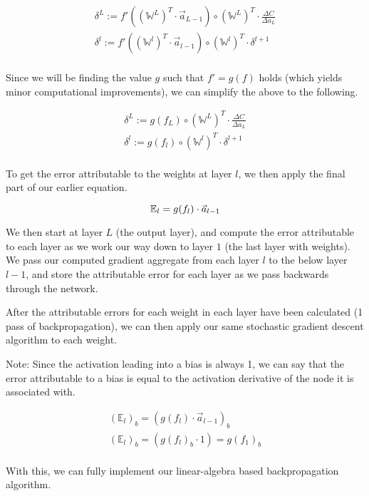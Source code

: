 \documentclass[8pt]{amsart}
\newcommand\mat[1]{\mathbb{#1}}
\begin{document}
\[
    \begin{aligned}
        \delta^L := f'( (\mat{W}^L)^T \cdot \vec{a}_{L - 1} ) \circ (\mat{W}^L)^T \cdot \frac{ \Delta C }{ \Delta a_L } \\
        \delta^l := f'( (\mat{W}^{l})^T \cdot \vec{a}_{l - 1} ) \circ (\mat{W}^{l})^T \cdot \delta^{l + 1} \\
    \end{aligned}
\]

Since we will be finding the value $g$ such that $f' = g(f)$ holds (which yields minor
computational improvements), we can simplify the above to the following.

\[
    \begin{aligned}
        \delta^L := g(f_L) \circ (\mat{W}^L)^T \cdot \frac{ \Delta C }{ \Delta a_L } \\
        \delta^l := g(f_l) \circ (\mat{W}^{l})^T \cdot \delta^{l + 1} \\
    \end{aligned}
\]

To get the error attributable to the weights at layer $l$, we then apply the final part
of our earlier equation.

\[
    \mat{E}_l = g(f_l) \cdot \vec{a}_{l - 1} \\
\]

We then start at layer $L$ (the output layer), and compute the error attributable to
each layer as we work our way down to layer $1$ (the last layer with weights). We pass
our computed gradient aggregate from each layer $l$ to the below layer $l - 1$, and store
the attributable error for each layer as we pass backwards through the network.

After the attributable errors for each weight in each layer have been calculated (1 pass
of backpropagation), we can then apply our same stochastic gradient descent algorithm to
each weight.

Note: Since the activation leading into a bias is always 1, we can say that the error
attributable to a bias is equal to the activation derivative of the node it is associated
with.

\[
    \begin{aligned}
        (\mat{E}_l)_b = (g(f_l) \cdot \vec{a}_{l - 1})_{b} \\
        (\mat{E}_l)_b = (g(f_l)_{b} \cdot 1) = g(f_1)_b \\
    \end{aligned}
\]

With this, we can fully implement our linear-algebra based backpropagation algorithm.
\end{document}
